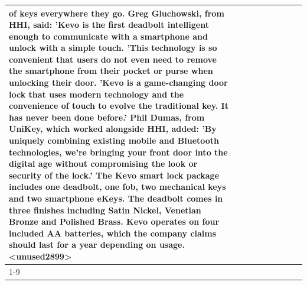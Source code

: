 \begin{table}[H]
\begin{tabular}{lllrlllll}
of keys everywhere they go. Greg Gluchowski, from HHI, said: 'Kevo is the first deadbolt intelligent enough to communicate with a smartphone and unlock with a simple touch. 'This technology is so convenient that users do not even need to remove the smartphone from their pocket or purse when unlocking their door. 'Kevo is a game-changing door lock that uses modern technology and the convenience of touch to evolve the traditional key. It has never been done before.' Phil Dumas, from UniKey, which worked alongside HHI, added: 'By uniquely combining existing mobile and Bluetooth technologies, we’re bringing your front door into the digital age without compromising the look or security of the lock.' The Kevo smart lock package includes one deadbolt, one fob, two mechanical keys and two smartphone eKeys. The deadbolt comes in three finishes including Satin Nickel, Venetian Bronze and Polished Brass. Kevo operates on four included AA batteries, which the company claims should last for a year depending on usage.<unused2899> \\
\cline{1-9}

\end{tabular}
\end{table}
